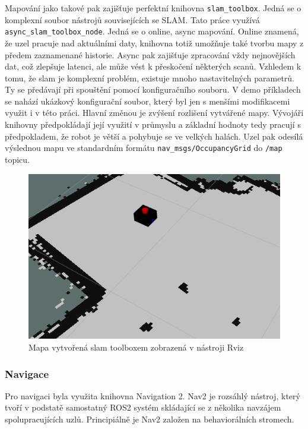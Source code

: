 Mapování jako takové pak zajišťuje perfektní knihovna \verb|slam_toolbox|. Jedná se o komplexní soubor nástrojů souvisejících se SLAM. Tato práce využívá \verb|async_slam_toolbox_node|. Jedná se o online, async mapování. Online znamená, že uzel pracuje nad aktuálními daty, knihovna totiž umožňuje také tvorbu mapy z předem zaznamenané historie. Async pak zajišťuje zpracování vždy nejnovějších dat, což zlepšuje latenci, ale může vést k přeskočení některých scanů. Vzhledem k tomu, že slam je komplexní problém, existuje mnoho nastavitelných parametrů. Ty se předávají při spouštění pomocí konfiguračního souboru. V demo příkladech se nahází ukázkový konfigurační soubor, který byl jen s menšími modifikacemi využit i v této práci. Hlavní změnou je zvýšení rozlišení vytvářené mapy. Vývojáři knihovny předpokládají její využití v průmyslu a základní hodnoty tedy pracují s předpokladem, že robot je větší a pohybuje se ve velkých halách. Uzel pak odesílá výslednou mapu ve standardním formátu \verb|nav_msgs/OccupancyGrid| do \verb|/map| topicu.

\begin{figure}[h!]
	\centering
	\includegraphics[scale=0.7]{obrazky-figures/slam.png}
	\caption{Mapa vytvořená slam toolboxem zobrazená v nástroji Rviz}
	\label{}
\end{figure}

\subsubsection*{Navigace}
Pro navigaci byla využita knihovna Navigation 2. Nav2 je rozsáhlý nástroj, který tvoří v podstatě samostatný ROS2 systém skládající se z několika navzájem spolupracujících uzlů. Principiálně je Nav2 založen na behaviorálních stromech.

